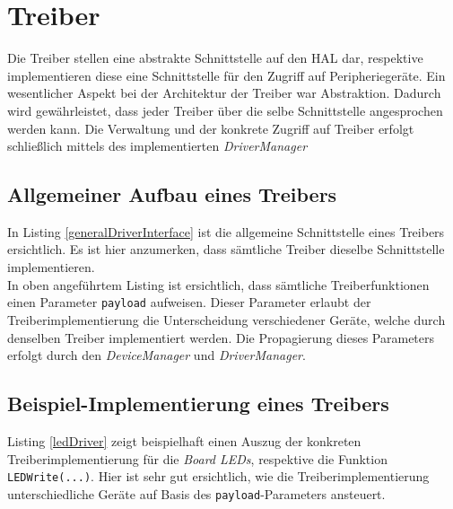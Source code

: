 \section{Treiber}
\label{chapDriver}
Die Treiber stellen eine abstrakte Schnittstelle auf den \ac{HAL} dar, respektive implementieren diese eine Schnittstelle für den Zugriff auf Peripheriegeräte. Ein wesentlicher Aspekt bei der Architektur der Treiber war Abstraktion. Dadurch wird gewährleistet, dass jeder Treiber über die selbe Schnittstelle angesprochen werden kann. Die Verwaltung und der konkrete Zugriff auf Treiber erfolgt schließlich mittels des implementierten \textit{DriverManager}

\subsection{Allgemeiner Aufbau eines Treibers}
In Listing \ref{generalDriverInterface} ist die allgemeine Schnittstelle eines Treibers ersichtlich. Es ist hier anzumerken, dass sämtliche Treiber dieselbe Schnittstelle implementieren.\\



In oben angeführtem Listing ist ersichtlich, dass sämtliche Treiberfunktionen einen Parameter \texttt{payload} aufweisen. Dieser Parameter erlaubt der Treiberimplementierung die Unterscheidung verschiedener Geräte, welche durch denselben Treiber implementiert werden. Die Propagierung dieses Parameters erfolgt durch den \textit{DeviceManager} und \textit{DriverManager}.

\subsection{Beispiel-Implementierung eines Treibers}
Listing \ref{ledDriver} zeigt beispielhaft einen Auszug der konkreten Treiberimplementierung für die \textit{Board LEDs}, respektive die Funktion \texttt{LEDWrite(...)}. Hier ist sehr gut ersichtlich, wie die Treiberimplementierung unterschiedliche Geräte auf Basis des \texttt{payload}-Parameters ansteuert.\\



